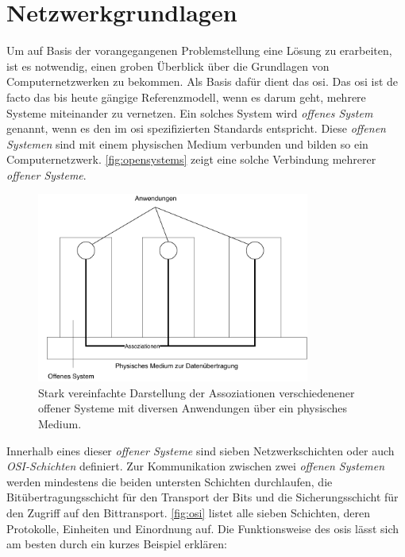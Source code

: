 \documentclass[titlepage]{report}
\begin{document}
\section{Netzwerkgrundlagen}
Um auf Basis der vorangegangenen Problemstellung eine Lösung zu
erarbeiten, ist es notwendig, einen groben Überblick über die Grundlagen
von Computernetzwerken zu bekommen. Als Basis dafür dient das \gls{osi}. Das
\gls{osi} ist de facto das bis heute gängige Referenzmodell, wenn es
darum geht, mehrere Systeme miteinander zu vernetzen. Ein solches System
wird \emph{offenes System} genannt, wenn es den im \gls{osi}
spezifizierten Standards entspricht\cite[Siehe Abschnitt
4.1.2]{ITUOSI}. Diese \emph{offenen Systemen} sind mit einem physischen
Medium verbunden und bilden so ein Computernetzwerk. \autoref{fig:opensystems}
zeigt eine solche Verbindung mehrerer \emph{offener Systeme}.
\begin{figure}[H]
    \centering
    \includegraphics[width=0.8\textwidth]{figures/open_systems.pdf}
    \caption{Stark vereinfachte Darstellung der Assoziationen verschiedenener offener
    Systeme mit diversen Anwendungen über ein physisches Medium.}\label{fig:opensystems}
\end{figure}
Innerhalb eines dieser \emph{offener Systeme} sind sieben
Netzwerkschichten oder auch \emph{OSI-Schichten} definiert\cite[Siehe
Abschnitt 6.1.2]{ITUOSI}. Zur
Kommunikation zwischen zwei \emph{offenen Systemen} werden mindestens
die beiden untersten Schichten durchlaufen, die Bitübertragungsschicht
für den Transport der Bits und die Sicherungsschicht für den Zugriff auf
den Bittransport.
\autoref{fig:osi} listet alle sieben Schichten, deren Protokolle,
Einheiten und Einordnung auf. Die Funktionsweise des \gls{osi}s lässt
sich am besten durch ein kurzes Beispiel erklären:
\end{document}
